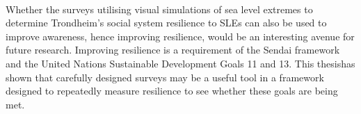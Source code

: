 \paragraph{}

Whether the surveys utilising visual simulations of sea level extremes to determine Trondheim's social system resilience to SLEs can also be used to improve awareness, hence improving resilience, would be an interesting avenue for future research. Improving resilience is a requirement of the Sendai framework and the United Nations Sustainable Development Goals 11 and 13. This thesishas shown that carefully designed surveys may be a useful tool in a framework designed to repeatedly measure resilience to see whether these goals are being met.
